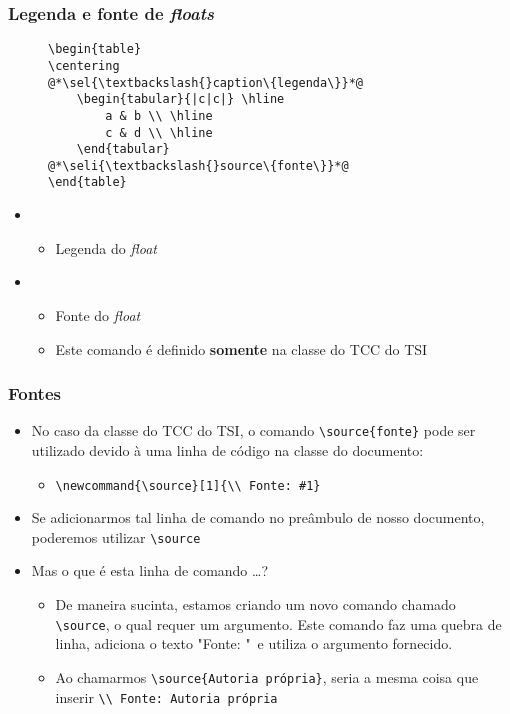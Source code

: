 \begin{frame}[fragile,label={slide:floatcaptionsource}] \frametitle{Legenda e fonte de \textit{floats}}
\begin{figure}[!t]
\begin{lstlisting}
\begin{table}
\centering
@*\sel{\textbackslash{}caption\{legenda\}}*@
	\begin{tabular}{|c|c|} \hline
		a & b \\ \hline
		c & d \\ \hline
	\end{tabular}
@*\seli{\textbackslash{}source\{fonte\}}*@
\end{table}
\end{lstlisting}
\end{figure}

\begin{itemize}
	\item {}
	\begin{itemize}
		\item Legenda do \textit{float}
	\end{itemize}
	\item {}
	\begin{itemize}
		\item Fonte do \textit{float}
		\item Este comando é definido \textbf{somente} na classe do TCC do TSI
	\end{itemize}
\end{itemize}
\end{frame}

\begin{frame}[fragile,label={slide:floatjustsource}] \frametitle{Fontes}
\begin{itemize}
	\item No caso da classe do TCC do TSI, o comando \texttt{\textbackslash{}source\{fonte\}} pode ser utilizado devido à uma linha de código na classe do documento:
	\begin{itemize}
		\item \texttt{\textbackslash{}newcommand\{\textbackslash{}source\}[1]\{\textbackslash{}\textbackslash{} Fonte: \#1\}}
	\end{itemize}
	\item Se adicionarmos tal linha de comando no preâmbulo de nosso documento, poderemos utilizar \texttt{\textbackslash{}source}
	\item Mas o que é esta linha de comando \ldots?
	\begin{itemize}
		\item De maneira sucinta, estamos criando um novo comando chamado \texttt{\textbackslash{}source}, o qual requer um argumento. Este comando faz uma quebra de linha, adiciona o texto "Fonte: "~e utiliza o argumento fornecido.
		\item Ao chamarmos \texttt{\textbackslash{}source\{Autoria própria\}}, seria a mesma coisa que inserir \texttt{{\textbackslash{}\textbackslash{} Fonte: Autoria própria}}
		\end{itemize}	
	\end{itemize}
\end{frame}

